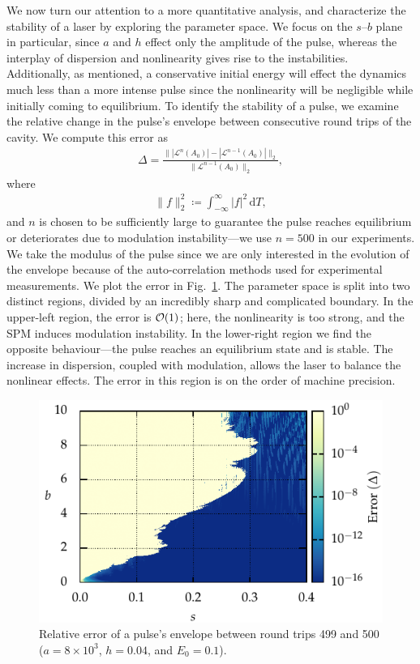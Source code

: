 \documentclass[9pt,twocolumn,twoside]{osajnl}
\let\originalleft\left
\let\originalright\right
\renewcommand{\left}{\mathopen{}\mathclose\bgroup\originalleft}
\renewcommand{\right}{\aftergroup\egroup\originalright}
\providecommand{\df}{\textrm{d}} %
\providecommand{\bigO}[1]{\ensuremath{\mathop{}\mathopen{}\mathcal{O}\mathopen{}\left(#1\right)}} %
\begin{document}
We now turn our attention to a more quantitative analysis, and characterize the stability of a laser by exploring the parameter space. We focus on the $s$--$b$ plane in particular, since $a$ and $h$ effect only the amplitude of the pulse, whereas the interplay of dispersion and nonlinearity gives rise to the instabilities. Additionally, as mentioned, a conservative initial energy will effect the dynamics much less than a more intense pulse since the nonlinearity will be negligible while initially coming to equilibrium. To identify the stability of a pulse, we examine the relative change in the pulse's envelope between consecutive round trips of the cavity. We compute this error as
\begin{align}
	\Delta = \frac{\| |\mathcal{L}^n(A_0)| - |\mathcal{L}^{n-1}(A_0)| \|_2}{\| \mathcal{L}^{n-1}(A_0) \|_2},
	\label{eq:error}
\end{align}
where
\begin{align}
	\| f \|_2^2 \coloneqq \int_{-\infty}^\infty |f|^2 \, \df T,
\end{align}
and $n$ is chosen to be sufficiently large to guarantee the pulse reaches equilibrium or deteriorates due to modulation instability---we use $n = 500$ in our experiments. We take the modulus of the pulse since we are only interested in the evolution of the envelope because of the auto-correlation methods used for experimental measurements. We plot the error in Fig.~\ref{fig:error}. The parameter space is split into two distinct regions, divided by an incredibly sharp and complicated boundary. In the upper-left region, the error is $\bigO{1}$; here, the nonlinearity is too strong, and the SPM induces modulation instability. In the lower-right region we find the opposite behaviour---the pulse reaches an equilibrium state and is stable. The increase in dispersion, coupled with modulation, allows the laser to balance the nonlinear effects. The error in this region is on the order of machine precision.

\begin{figure}[tbp]
	\centering
	\includegraphics{Figures/ParamSpaceErr}
	\caption{Relative error of a pulse's envelope between round trips 499 and 500 ($a = 8 \times 10^3$, $h = 0.04$, and $E_0 = 0.1$).}
	\label{fig:error}
\end{figure}
\end{document}
